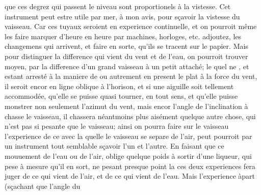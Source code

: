  que ces degrez qui passent le niveau sont proportionels \`{a} la vistesse. Cet instrument\protect{} peut estre utile par mer, \`{a} mon avis, pour s\c{c}avoir la vistesse du vaisseau\protect{}. Car ces tuyaux\protect{} seroient en experience\protect{} continuelle, et on pourroit même les faire marquer d'heure en heure par machines\protect{}, horloges\protect{}, etc. adjoutez, les changemens qui arrivent, et faire en sorte, qu'ils se tracent sur le papier. Mais pour distinguer la difference qui vient du vent et de l'eau, on pourroit trouver moyen, par la difference d'un grand vaisseau\protect{} \`{a} un petit attach\'{e}; le quel ne , et estant arrest\'{e} \`{a} la maniere de  ou autrement en present le plat \`{a}  la force du vent\protect{}, il seroit encor  en ligne oblique \`{a} l'horison, et si une aiguille\protect{} soit tellement accommod\'{e}e, qu'elle se puisse quasi tourner, en tout sens, et qu'elle puisse monstrer non seulement l'azimut du vent, mais encor l'angle de l'inclination \`{a}  chasse le vaisseau\protect{}, il chassera n\'{e}antmoins plus ais\'{e}ment quelque autre chose, qui n'est pas si pesante que le vaisseau\protect{}; ainsi on pourra faire sur le vaisseau\protect{} l'experience\protect{} de ce  avec la quelle le vaisseau\protect{} se separe de l'air, peut  pourroit par un instrument\protect{} tout semblable s\c{c}avoir l'un et l'autre. En faisant que ce mouuement de l'eau ou de l'air, oblige quelque poids \`{a} sortir d'une liqueur, qui pese \`{a} mesure qu'il en sort, ne pesant presque point la  ces deux experiences\protect{} fera juger de ce qui vient de l'air, et de ce qui vient de l'eau. Mais  l'experience\protect{} \`{a}part (s\c{c}achant que l'angle du 